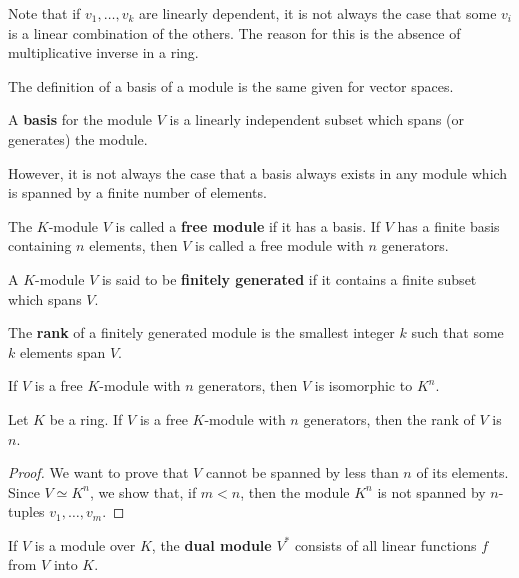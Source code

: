 Note that if $v_1, \ldots, v_k$ are linearly dependent, it is not always the case that some $v_i$ is a linear combination of the others. The reason for this is the absence of multiplicative inverse in a ring.

The definition of a basis of a module is the same given for vector spaces.

\begin{definition}[Basis]
	A \textbf{basis} for the module $V$ is a linearly independent subset which spans (or generates) the module.
\end{definition}

However, it is not always the case that a basis always exists in any module which is spanned by a finite number of elements.

\begin{definition}
	The $K$-module $V$ is called a \textbf{free module} if it has a basis. If $V$ has a finite basis containing $n$ elements, then $V$ is called a free module with $n$ generators.
\end{definition}

\begin{definition}
	A $K$-module $V$ is said to be \textbf{finitely generated} if it contains a finite subset which spans $V$.
	
	The \textbf{rank} of a finitely generated module is the smallest integer $k$ such that some $k$ elements span $V$.
\end{definition}

\begin{remark}
	If $V$ is a free $K$-module with $n$ generators, then $V$ is isomorphic to $K^n$.
\end{remark}

\begin{theorem}
	Let $K$ be a ring. If $V$ is a free $K$-module with $n$ generators, then the rank of $V$ is $n$.
\end{theorem}

\begin{proof}
	We want to prove that $V$ cannot be spanned by less than $n$ of its elements. Since $V \simeq K^n$, we show that, if $m < n$, then the module $K^n$ is not spanned by $n$-tuples $v_1, \ldots, v_m$.
\end{proof}

\begin{definition}
	If $V$ is a module over $K$, the \textbf{dual module} $V^\ast$ consists of all linear functions $f$ from $V$ into $K$.
\end{definition}

